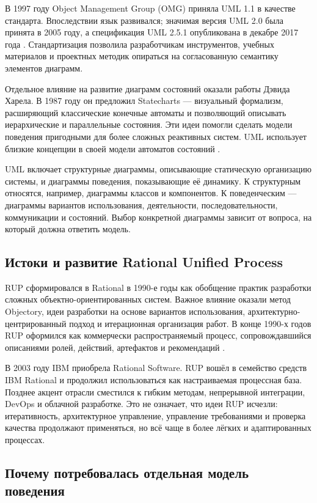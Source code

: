 \documentclass[essay,paper]{pmk-graduate}
\begin{document}
В 1997 году Object Management Group (OMG) приняла UML 1.1 в качестве стандарта. Впоследствии язык развивался; значимая версия UML 2.0 была принята в 2005 году, а спецификация UML 2.5.1 опубликована в декабре 2017 года \cite{omguml}. Стандартизация позволила разработчикам инструментов, учебных материалов и проектных методик опираться на согласованную семантику элементов диаграмм.

Отдельное влияние на развитие диаграмм состояний оказали работы Дэвида Харела. В 1987 году он предложил Statecharts — визуальный формализм, расширяющий классические конечные автоматы и позволяющий описывать иерархические и параллельные состояния. Эти идеи помогли сделать модели поведения пригодными для более сложных реактивных систем. UML использует близкие концепции в своей модели автоматов состояний \cite{harel1987}.

UML включает структурные диаграммы, описывающие статическую организацию системы, и диаграммы поведения, показывающие её динамику. К структурным относятся, например, диаграммы классов и компонентов. К поведенческим — диаграммы вариантов использования, деятельности, последовательности, коммуникации и состояний. Выбор конкретной диаграммы зависит от вопроса, на который должна ответить модель.

\subsection{Истоки и развитие Rational Unified Process}

RUP сформировался в Rational в 1990-е годы как обобщение практик разработки сложных объектно-ориентированных систем. Важное влияние оказали метод Objectory, идеи разработки на основе вариантов использования, архитектурно-центрированный подход и итерационная организация работ. В конце 1990-х годов RUP оформился как коммерчески распространяемый процесс, сопровождавшийся описаниями ролей, действий, артефактов и рекомендаций \cite{kruchten2003,jacobson1999}.

В 2003 году IBM приобрела Rational Software. RUP вошёл в семейство средств IBM Rational и продолжил использоваться как настраиваемая процессная база. Позднее акцент отрасли сместился к гибким методам, непрерывной интеграции, DevOps и облачной разработке. Это не означает, что идеи RUP исчезли: итеративность, архитектурное управление, управление требованиями и проверка качества продолжают применяться, но всё чаще в более лёгких и адаптированных процессах.

\subsection{Почему потребовалась отдельная модель поведения}
\end{document}
